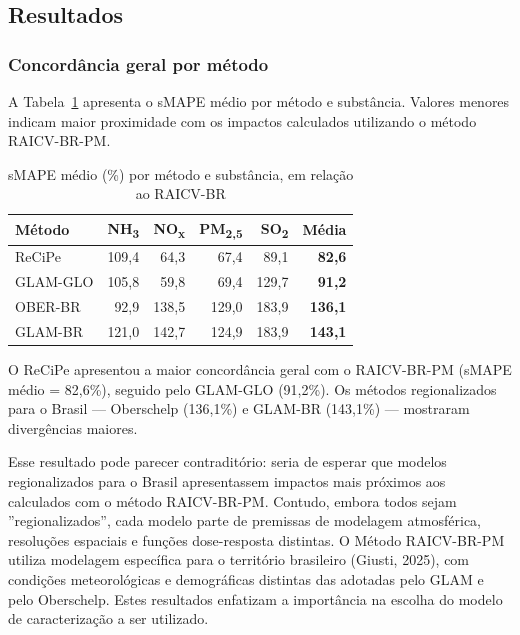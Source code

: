 \subsection{Resultados}

\subsubsection{Concord\^ancia geral por m\'etodo}

A Tabela~\ref{tab:smape-medio} apresenta o sMAPE m\'edio por m\'etodo e subst\^ancia. Valores menores indicam maior proximidade com os impactos calculados utilizando o método RAICV-BR-PM.

\begin{table}[H]
\centering
\caption{sMAPE m\'edio (\%) por m\'etodo e subst\^ancia, em rela\c{c}\~ao ao RAICV-BR}
\label{tab:smape-medio}
\begin{tabular}{lrrrrr}
\toprule
\textbf{M\'etodo} & \textbf{NH\textsubscript{3}} & \textbf{NO\textsubscript{x}} & \textbf{PM\textsubscript{2,5}} & \textbf{SO\textsubscript{2}} & \textbf{M\'edia} \\
\midrule
ReCiPe   & 109,4 &  64,3 &  67,4 &  89,1 & \textbf{82,6} \\
GLAM-GLO & 105,8 &  59,8 &  69,4 & 129,7 & \textbf{91,2} \\
OBER-BR  &  92,9 & 138,5 & 129,0 & 183,9 & \textbf{136,1} \\
GLAM-BR  & 121,0 & 142,7 & 124,9 & 183,9 & \textbf{143,1} \\
\bottomrule
\end{tabular}
\end{table}

O ReCiPe apresentou a maior concord\^ancia geral com o RAICV-BR-PM (sMAPE m\'edio = 82,6\%), seguido pelo GLAM-GLO (91,2\%). Os m\'etodos regionalizados para o Brasil --- Oberschelp (136,1\%) e GLAM-BR (143,1\%) --- mostraram diverg\^encias maiores.

Esse resultado pode parecer contradit\'orio: seria de esperar que modelos regionalizados para o Brasil apresentassem impactos mais próximos aos calculados com o método RAICV-BR-PM. Contudo, embora todos sejam ''regionalizados'', cada modelo parte de premissas de modelagem atmosf\'erica, resolu\c{c}\~oes espaciais e fun\c{c}\~oes dose-resposta distintas. O Método RAICV-BR-PM utiliza modelagem espec\'ifica para o territ\'orio brasileiro (Giusti, 2025), com condi\c{c}\~oes meteorol\'ogicas e demogr\'aficas distintas das adotadas pelo GLAM e pelo Oberschelp. Estes resultados enfatizam a importância na escolha do modelo de caracterização a ser utilizado.

